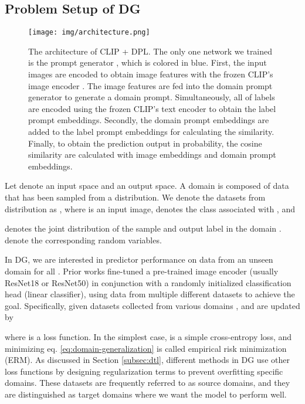 \documentclass[letterpaper]{article} \usepackage[]{aaai23}
\newcommand{\dplshort}{DPL}
\begin{document}
\subsection{Problem Setup of DG}

\begin{figure}[h]
\begin{center}
\texttt{[image: img/architecture.png]}
\end{center}
  \caption{
  The architecture of CLIP + \dplshort.
  The only one network we trained is the prompt generator , which is colored in blue.
  First, the input images are encoded to obtain image features with the frozen CLIP’s image encoder .
  The image features are fed into the domain prompt generator  to generate a domain prompt. 
  Simultaneously, all of labels are encoded using the frozen CLIP’s text encoder  to obtain the label prompt embeddings.
  Secondly, the domain prompt embeddings are added to the label prompt embeddings for calculating the similarity.
  Finally, to obtain the prediction output in probability, the cosine similarity  are calculated with image embeddings and domain prompt embeddings.
 }
\label{fig:architecture}
\end{figure}



Let  denote an input space and  an output space.
A domain is composed of data that has been sampled from a distribution.
We denote the datasets from distribution as 
,
where 
 is an input image, 
 denotes the class associated with , and 
 
denotes the joint distribution of the sample and output label in the domain .
 denote the corresponding random variables.

In DG, we are interested in predictor  performance on data from an unseen domain  for all . 
Prior works fine-tuned a pre-trained image encoder  (usually ResNet18 or ResNet50) in conjunction with a randomly initialized classification head  (linear classifier), using data from multiple different datasets to achieve the goal. 
Specifically, given  datasets  collected from various domains ,   and  are updated by  

where  is a loss function. 
In the simplest case,  is a simple cross-entropy loss, and minimizing eq. \ref{eq:domain-generalization} is called empirical risk minimization (ERM).
As discussed in Section \autoref{subsec:dtl}, different methods in DG use other loss functions by designing regularization terms to prevent overfitting specific domains.
These datasets are frequently referred to as source domains, and they are distinguished as target domains where we want the model to perform well. 
\end{document}
